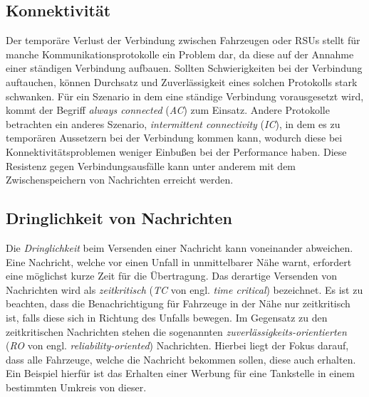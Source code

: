 \documentclass[english,runningheads,a4paper]{llncs}[2018/03/10]
\begin{document}
\subsection{Konnektivität}
Der temporäre Verlust der Verbindung zwischen Fahrzeugen oder RSUs stellt für manche Kommunikationsprotokolle ein Problem dar, da diese auf der Annahme einer ständigen Verbindung aufbauen.
Sollten Schwierigkeiten bei der Verbindung auftauchen, können Durchsatz und Zuverlässigkeit eines solchen Protokolls stark schwanken.
Für ein Szenario in dem eine ständige Verbindung vorausgesetzt wird, kommt der Begriff \textit{always connected} (\textit{AC}) zum Einsatz.
Andere Protokolle betrachten ein anderes Szenario, \textit{intermittent connectivity} (\textit{IC}), in dem es zu temporären Aussetzern bei der Verbindung kommen kann, wodurch diese bei Konnektivitätsproblemen weniger Einbußen bei der Performance haben.
Diese Resistenz gegen Verbindungsausfälle kann unter anderem mit dem Zwischenspeichern von Nachrichten erreicht werden\cite{conti2013mobile}.


\subsection{Dringlichkeit von Nachrichten}
Die \textit{Dringlichkeit} beim Versenden einer Nachricht kann voneinander abweichen.
Eine Nachricht, welche vor einen Unfall in unmittelbarer Nähe warnt, erfordert eine möglichst kurze Zeit für die Übertragung.
Das derartige Versenden von Nachrichten wird als \textit{zeitkritisch} (\textit{TC} von engl. \textit{time critical}) bezeichnet.
Es ist zu beachten, dass die Benachrichtigung für Fahrzeuge in der Nähe nur zeitkritisch ist, falls diese sich in Richtung des Unfalls bewegen.
Im Gegensatz zu den zeitkritischen Nachrichten stehen die sogenannten \textit{zuverlässigkeits-orientierten} (\textit{RO} von engl. \textit{reliability-oriented}) Nachrichten.
Hierbei liegt der Fokus darauf, dass alle Fahrzeuge, welche die Nachricht bekommen sollen, diese auch erhalten.
Ein Beispiel hierfür ist das Erhalten einer Werbung für eine Tankstelle in einem bestimmten Umkreis von dieser\cite{conti2013mobile}.
\end{document}
